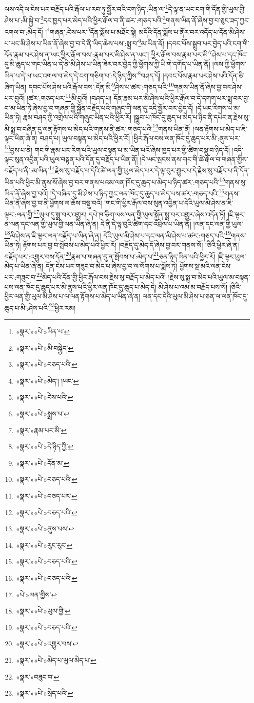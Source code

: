 ལས་འདི་ལ་ངེས་པར་བརྗོད་པའི་རྒོལ་པ་རབ་ཏུ་སྦྱོར་བའི་ངག་ཉིད་:ཡིན་ལ་\footnote{«སྣར་»«པེ་»ཡིན་པ་}དེ་ལྟ་ན་ཡང་ངག་གི་དོན་གྱི་ཡུལ་གྱི་ཤེས་པ་:མི་སྐྱེ་བ་\footnote{«སྣར་»«པེ་»མི་བསྐྱེད་}དང་ཁྱད་པར་མེད་པའི་ཕྱིར་རྒོལ་བ་ནི་ཚར་:གཅད་པའི་\footnote{«སྣར་»«པེ་»བཅད་པའི་}གནས་ཡིན་ནོ་ཞེས་བྱ་བ་ཅུང་ཟད་ཀྱང་འགལ་བ་:མེད་དོ། །\footnote{«སྣར་»«པེ་»མེད་། །ཡང་}གཞན་:ངེས་པར་\footnote{«སྣར་»«པེ་»ངེས་པའི་}དོན་སྨོས་པ་མཐོང་སྟེ། མདོའི་དོན་སྨོས་པ་ནོར་བར་འདོད་པ་དོན་མི་ཤེས་པ་ཡང་མི་ཤེས་པ་ཡིན་ནོ་ཞེས་བྱ་བ་དེ་ནི་ཡིད་ཆེས་པས་:སྨྲ་བ་\footnote{«སྣར་»«པེ་»སྨྲས་པ་}མ་ཡིན་ནོ། །དབང་པོས་སྒྲུབ་པར་བྱེད་པའི་ངག་གི་དོན་རྣམ་པར་ཤེས་ན་ཡང་ཕྱིར་རྒོལ་བས་:རྣམ་པར་མི་ཤེས་ན་ཡང་། ཕྱིར་རྒོལ་བས་རྣམ་པར་མི་\footnote{«སྣར་»རྣམ་པར་མི་}ཤེས་པ་དང་ཁོང་དུ་མི་ཆུད་པ་གང་ཡིན་པ་དེ་ནི་མི་ཤེས་པ་ཡིན་ཟེར་བར་བྱེད་ཀྱི་ཕྱོགས་ཀྱི་ཡི་གེ་དགོད་པ་ཡིན་ནོ། །ལས་ཀྱི་ཕྱོགས་ཡིན་པ་དེ་ལ་ཡང་འགལ་བ་མེད་དེ་ངག་གཅིག་པ་:དེ་ཉིད་ཀྱིས་\footnote{«སྣར་»«པེ་»དེ་ཉིད་ཀྱི་}བཤད་དོ། །དབང་པོས་རྣམ་པར་ཤེས་པའི་དོན་ཅི་ཞིག་ཡིན། དབང་པོས་ཤེས་པའི་རྒོལ་བས་:དོན་མི་\footnote{«སྣར་»«པེ་»དོན་མ་}ཤེས་པ་ཚར་:གཅད་པའི་\footnote{«སྣར་»«པེ་»བཅད་པའི་}གནས་ཡིན་ནོ་ཞེས་བྱ་བར་ཤེས་པར་བྱའོ། །ཚར་:གཅད་པར་\footnote{«སྣར་»«པེ་»བཅད་པར་}མི་བྱའོ། །བཤད་པ། དོན་རྣམ་པར་མི་ཤེས་པའི་ཕྱིར་རྒོལ་བ་དེ་དགག་པར་སྨྲ་བར་བྱ་བ་མ་ཡིན་ཏེ་ཞེས་བྱ་བ་གཞན་གྱི་སྐྱོན་བརྗོད་པའི་གཞུང་གི་ལན་དུ་འདི་སྦྱོར་བར་བྱེད་དོ། །དེ་ཡང་རིགས་པ་མ་ཡིན་ཏེ། རྣམ་བཤད་ཀྱི་འགྲེལ་པའི་གཞུང་ཡིན་པའི་ཕྱིར་རོ། །སྒྲུབ་པ་ཁོང་དུ་ཆུད་པ་མེད་པ་ཉིད་ནི་དཔེར་ན་རྗེས་སུ་མི་སྨྲ་བ་བཞིན་དུ་ལན་རྟོགས་པ་མེད་པའི་གནས་ནི་ཚར་:གཅད་པའི་\footnote{«སྣར་»«པེ་»བཅད་པའི་}གནས་ཡིན་ནོ། །ལན་རྟོགས་པ་མེད་པ་ཇི་ལྟར་ཡིན་ཞེ་ན། བཤད་པ། ཡུལ་བསྟན་པ་མེད་པའི་ཕྱིར་རོ། །ཕྱིར་རྒོལ་བས་ལན་ཁོང་དུ་ཆུད་པར་མི་:ནུས་པར་\footnote{«སྣར་»«པེ་»ནུས་པས་}བྱས་པ་ནི། གང་གི་རྣམ་པར་རིག་པའི་ཡུལ་བསྟན་པ་མ་ཡིན་པའོ་ཞེས་ཁྱད་པར་གྱི་ཚིག་བསྡུ་བ་ཉིད་དོ། །འདི་ལྟར་སུན་འབྱིན་པའི་ཡུལ་བསྟན་པའི་དོན་དུ་བརྗོད་པ་ཡིན་ནོ། །དེ་ཡང་སྤངས་ནས་གང་གི་ཚེ་རྒོལ་བ་གཞན་གྱིས་བརྗོད་པ་ནི་:མ་ཡིན་\footnote{«སྣར་»«པེ་»རུང་རུང་}རྗེས་སུ་བརྗོད་པ་དེའི་ཚེ་ལན་གྱི་ཡུལ་མེད་པར་དེ་ལྟ་བུར་གྱུར་པ་དེ་རྗེས་སུ་བརྗོད་པ་ནི་དོན་ཡིན་པའི་ཕྱིར་མི་ནུས་སོ་ཞེས་བྱ་བར་གནས་པའམ་ལན་ཁོང་དུ་ཆུད་པ་མེད་པ་ཉིད་ཚར་:གཅད་པའི་\footnote{«སྣར་»«པེ་»བཅད་པའི་}གནས་སུ་ཡིན་ནོ་ཞེས་བྱ་བའོ། །དེ་བཞིན་དུ་མི་ཤེས་པ་ཉིད་ཀྱང་ལན་ཁོང་དུ་ཆུད་པ་མེད་པས་ཚར་:གཅད་པའི་\footnote{«སྣར་»«པེ་»བཅད་པའི་}གནས་ཡིན་ནོ་ཞེས་བྱ་བ་ནི་ཕྱོགས་ལ་ཆོས་བསྡུ་བའོ། །གང་གི་ཕྱིར་རྒོལ་བས་སུན་འབྱིན་པ་དེའི་ཡུལ་མི་ཤེས་ན་ཇི་ལྟར་:ལན་གྱི་\footnote{«པེ་»ལན་གྱིས་}ཡུལ་དུ་སྨྲ་བར་འགྱུར། དཔེ་ཁ་ཅིག་ལས་ལན་གྱི་ཡུལ་སྐྱོན་སྨྲ་བར་འགྱུར་ཞེས་འདོན་ཏོ། །ཇི་ལྟར་ན་ལན་དང་ལན་གྱི་ཡུལ་གྱི་ལན་ཡིན་ཞེ་ན། དེ་ནི་དེ་ལྟ་བུའི་ཚིག་དང་འབྲེལ་པ་ཡིན་ནོ། །ལན་དང་ལན་གྱི་ཡུལ་\footnote{«སྣར་»«པེ་»ཡུལ་གྱི་}མི་ཤེས་ན་ཇི་ལྟར་ལན་བརྗོད་པ་ཡིན་ཞེ་ན། དེའི་ཡུལ་མི་ཤེས་པ་དང་ལན་མི་ཤེས་པ་ཚར་:གཅད་པའི་\footnote{«སྣར་»«པེ་»བཅད་པའི་}གནས་ཡིན་ཏེ། རྟོགས་པར་བྱ་བ་སྤོབས་པ་མེད་པའི་ཕྱིར་རོ། །བརྗོད་དུ་མེད་དོ་ཞེས་བྱ་བར་གནས་སོ། །ཅིའི་ཕྱིར་ཞེ་ན། བརྗོད་པར་:འགྱུར་བས་དོན་\footnote{«སྣར་»«པེ་»འགྱུར་བས་}རྣམ་པ་གཞན་དུ་ན་སྤོབས་པ་:མེད་པ་\footnote{«སྣར་»«པེ་»མེད་པ་ཡུལ་མེད་པ་}ཅན་ཉིད་ཡིན་པའི་ཕྱིར་རོ། །ཇི་ལྟར་ཡུལ་མེད་པ་ཡིན་ཞེ་ན། དོན་ངེས་པར་གཟུང་བ་མེད་པ་ཞེས་བྱ་བ་ལ་སོགས་པ་སྨོས་ཏེ། ཕྱོགས་སྔ་མའི་ལན་ངེས་པར་:གཟུང་བ་\footnote{«སྣར་»བཟུང་བ་}མེད་པའི་དོན་གྱི་ཕྱིར་རྒོལ་བས་རྗེས་སུ་བརྗོད་པ་མེད་པའོ། །རྗེས་སུ་སྨྲ་བ་མེད་པའི་ཡུལ་མ་བསྟན་པས་ལན་ཁོང་དུ་ཆུད་པར་མི་ནུས་པའི་ཕྱིར་ལན་ཁོང་དུ་ཆུད་པ་མེད་དེ། མི་ཤེས་པ་འམ་མ་བརྗོད་པས་སོ། །ཅིའི་ཕྱིར་ལན་གྱི་ཡུལ་མི་ཤེས་པ་ལ་ལན་རྟོགས་པ་མེད་པ་ཡིན་ཞེ་ན། ལན་དང་དེའི་ཡུལ་མི་ཤེས་པ་ཅན་ལ་ལན་ཁོང་དུ་ཆུད་པ་མི་:ཤེས་པའི་\footnote{«སྣར་»«པེ་»སྲིད་པའི་}ཕྱིར་རམ། 